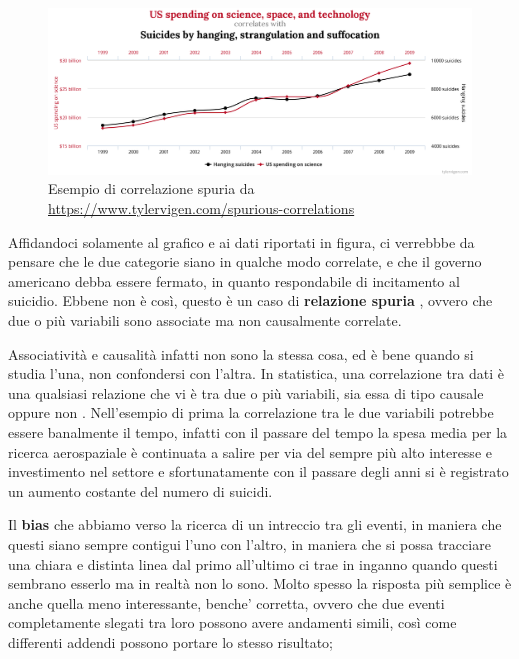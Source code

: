 \begin{figure}[h]
    \begin{center}
        \includegraphics[width=\linewidth]{img/chart.png}
        \caption{Esempio di correlazione spuria da 
        \url{https://www.tylervigen.com/spurious-correlations}}
        \label{fig:spurious_relations}
    \end{center}
\end{figure}

Affidandoci solamente al grafico e ai dati riportati in 
figura, ci verrebbbe da pensare che le due categorie 
siano in qualche modo correlate, e che il governo 
americano debba essere fermato, in quanto respondabile di 
incitamento al suicidio.
Ebbene non è così, questo è un caso di \textbf{relazione 
spuria} \cite{wiki:Spurious_relationship}, ovvero che due o 
più variabili sono associate ma non causalmente correlate.

Associatività e causalità infatti non sono la stessa cosa,
ed è bene quando si studia l'una, non confondersi con l'altra.
In statistica, una correlazione tra dati è una qualsiasi 
relazione che vi è tra due o più variabili, sia essa di 
tipo causale oppure non \cite{wiki:Correlation}. 
Nell'esempio di prima la correlazione
tra le due variabili potrebbe essere banalmente il tempo, 
infatti con il passare del tempo la spesa media per la 
ricerca aerospaziale è continuata a salire per via 
del sempre più alto interesse e investimento nel settore
e sfortunatamente con il passare degli anni si è registrato
un aumento costante del numero di suicidi. 

Il \textbf{bias} che abbiamo verso la ricerca di un intreccio
tra gli eventi, in maniera che questi siano sempre contigui
l'uno con l'altro, in maniera che si possa tracciare una 
chiara e distinta linea dal primo all'ultimo ci trae in 
inganno quando questi sembrano esserlo ma in realtà non lo sono.
Molto spesso la risposta più semplice è anche quella meno 
interessante, benche' corretta, ovvero che due eventi 
completamente slegati tra loro possono avere andamenti simili, 
così come differenti addendi possono portare lo stesso risultato; 

